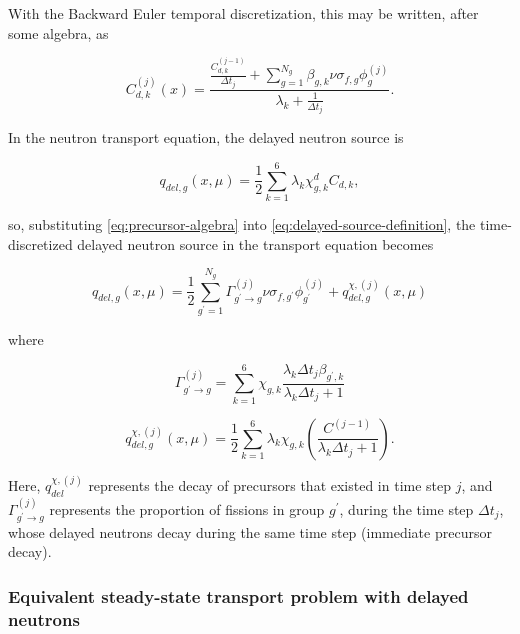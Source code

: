 \documentclass{proposal}
\newcommand{\p}{\ensuremath{^\prime}}
\newcommand{\rarr}{\ensuremath{\rightarrow}}
\begin{document}
With the Backward Euler temporal discretization, this may be written, after some algebra, as

\begin{equation}\label{eq:precursor-algebra}
    C_{d, k}^{(j)}(x) = \frac{\frac{C_{d, k}^{(j-1)}}{\Delta t_j} + \sum_{g=1}^{N_g} \beta_{g, k}\nu\sigma_{f, g}\phi_g^{(j)}}{\lambda_k + \frac{1}{\Delta t_j}}.
\end{equation}

In the neutron transport equation, the delayed neutron source is

\begin{equation}\label{eq:delayed-source-definition}
    q_{del, g}(x, \mu) = \frac{1}{2}\sum_{k=1}^{6}\lambda_k \chi_{g, k}^d C_{d, k},
\end{equation}

so, substituting \cref{eq:precursor-algebra} into \cref{eq:delayed-source-definition}, the time-discretized delayed neutron source in the transport equation becomes

\begin{equation}\label{eq:delayed-source}
    q_{del, g}(x, \mu) = \frac{1}{2}\sum_{g\p = 1}^{N_g} {\Gamma}^{(j)}_{g\p\rarr g} \nu \sigma_{f, g\p} \phi_{g\p}^{(j)} + q^{\chi,(j)}_{del, g}(x, \mu)
\end{equation}

where

\begin{equation}
    {\Gamma}^{(j)}_{g\p\rarr g} = \sum_{k=1}^6 \chi_{g, k}\frac{\lambda_k\Delta t_j \beta_{g\p, k}}{\lambda_k \Delta t_j + 1}
\end{equation}

\begin{equation}
    q^{\chi,(j)}_{del, g}(x, \mu) = \frac{1}{2}\sum_{k=1}^6 \lambda_k \chi_{g, k} \left(\frac{C^{(j-1)}}{\lambda_k \Delta t_j + 1} \right).
\end{equation}

Here, $q^{\chi,(j)}_{del}$ represents the decay of precursors that existed in time step $j$, and ${\Gamma}^{(j)}_{g\p\rarr g}$ represents the proportion of fissions in group $g\p$, during the time step $\Delta t_j$, whose delayed neutrons decay during the same time step (immediate precursor decay).

\subsubsection{Equivalent steady-state transport problem with delayed neutrons}
\end{document}
